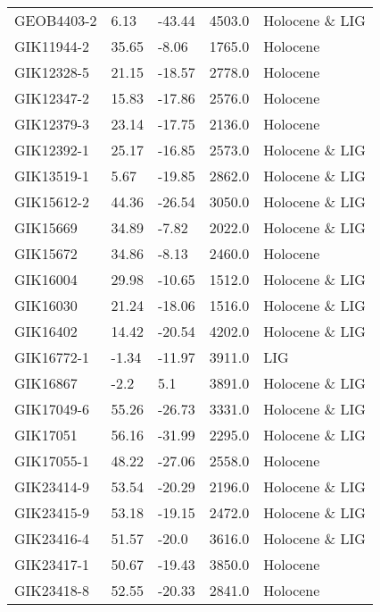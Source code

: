 \begin{longtable}{lllrl}
       GEOB4403-2 &     6.13 &    -43.44 &     4503.0 &  Holocene \& LIG \\
       GIK11944-2 &    35.65 &     -8.06 &     1765.0 &        Holocene \\
       GIK12328-5 &    21.15 &    -18.57 &     2778.0 &        Holocene \\
       GIK12347-2 &    15.83 &    -17.86 &     2576.0 &        Holocene \\
       GIK12379-3 &    23.14 &    -17.75 &     2136.0 &        Holocene \\
       GIK12392-1 &    25.17 &    -16.85 &     2573.0 &  Holocene \& LIG \\
       GIK13519-1 &     5.67 &    -19.85 &     2862.0 &  Holocene \& LIG \\
       GIK15612-2 &    44.36 &    -26.54 &     3050.0 &  Holocene \& LIG \\
         GIK15669 &    34.89 &     -7.82 &     2022.0 &  Holocene \& LIG \\
         GIK15672 &    34.86 &     -8.13 &     2460.0 &        Holocene \\
         GIK16004 &    29.98 &    -10.65 &     1512.0 &  Holocene \& LIG \\
         GIK16030 &    21.24 &    -18.06 &     1516.0 &  Holocene \& LIG \\
         GIK16402 &    14.42 &    -20.54 &     4202.0 &  Holocene \& LIG \\
       GIK16772-1 &    -1.34 &    -11.97 &     3911.0 &             LIG \\
         GIK16867 &     -2.2 &       5.1 &     3891.0 &  Holocene \& LIG \\
       GIK17049-6 &    55.26 &    -26.73 &     3331.0 &  Holocene \& LIG \\
         GIK17051 &    56.16 &    -31.99 &     2295.0 &  Holocene \& LIG \\
       GIK17055-1 &    48.22 &    -27.06 &     2558.0 &        Holocene \\
       GIK23414-9 &    53.54 &    -20.29 &     2196.0 &  Holocene \& LIG \\
       GIK23415-9 &    53.18 &    -19.15 &     2472.0 &  Holocene \& LIG \\
       GIK23416-4 &    51.57 &     -20.0 &     3616.0 &  Holocene \& LIG \\
       GIK23417-1 &    50.67 &    -19.43 &     3850.0 &        Holocene \\
       GIK23418-8 &    52.55 &    -20.33 &     2841.0 &        Holocene \\

\end{longtable}

